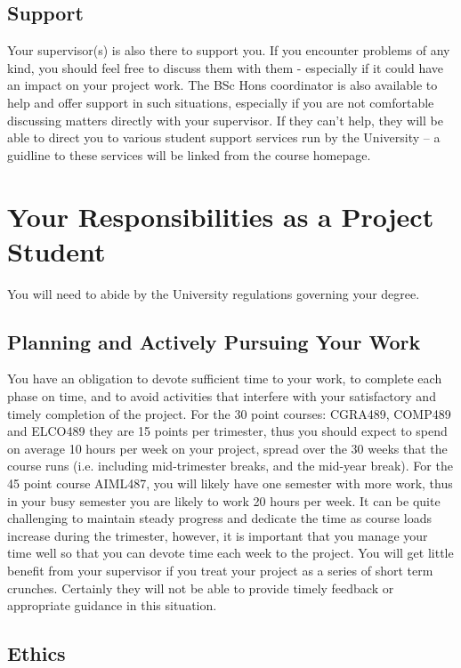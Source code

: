 \subsection{Support}

Your supervisor(s) is also there to support you. If you encounter
problems of any kind, you should feel free to discuss them with them -
especially if it could have an impact on your project work.  The BSc Hons 
coordinator is also available to help and offer support in such
situations, especially if you are not comfortable discussing matters
directly with your supervisor.  If they can't help, they will be able
to direct you to various student support services run by the
University -- a guidline to these services will be linked from the
course homepage.

\section{Your Responsibilities as a Project Student}

You will need to abide by the University regulations governing your
degree.

\subsection{Planning and Actively Pursuing Your Work}

You have an obligation to devote sufficient time to your work, to
complete each phase on time, and to avoid activities that interfere
with your satisfactory and timely completion of the project.  
For the 30 point courses: CGRA489, COMP489 and ELCO489
they are 15 points per trimester, thus you should expect to spend 
on average 10 hours per week on your project,
spread over the 30 weeks that the course runs (i.e. including
mid-trimester breaks, and the mid-year break).  
For the 45 point course AIML487, you will likely have one semester with 
more work, thus in your busy semester you are likely to work 20 hours per week.
It can be quite
challenging to maintain steady progress and dedicate the time as
course loads increase during the trimester, however, it is important
that you manage your time well so that you can devote time each week to the project.  
You will get little benefit from your
supervisor if you treat your project as a series of short term crunches.
Certainly they will not be able to provide timely feedback or
appropriate guidance in this situation.

\subsection{Ethics}


